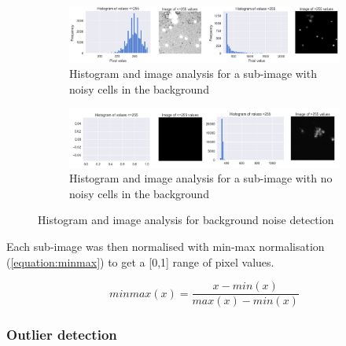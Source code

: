 \begin{figure}[h!]
    \centering
    \begin{subfigure}[h!]{0.99\textwidth}
        \includegraphics[width=\textwidth]{dissertation/figures/background_noise_true.png}
        \caption{Histogram and image analysis for a sub-image with noisy cells in the background}
        \label{fig:bgnoisetrue}
    \end{subfigure}
    
    \begin{subfigure}[h!]{0.99\textwidth}
        \includegraphics[width=\textwidth]{dissertation/figures/background_noise_false.png}
        \caption{Histogram and image analysis for a sub-image with no noisy cells in the background}
        \label{fig:bgnoisefalse}
    \end{subfigure}
    
    \caption{Histogram and image analysis for background noise detection}
    \label{fig:bgnoise}
    
\end{figure}

Each sub-image was then normalised with min-max normalisation (\autoref{equation:minmax}) to get a [0,1] range of pixel values. 

\begin{equation}
    minmax(x) = \frac{x - min(x)}{max(x) - min(x)}
\label{equation:minmax}
\end{equation} 

\bigskip
\subsubsection{Outlier detection}

